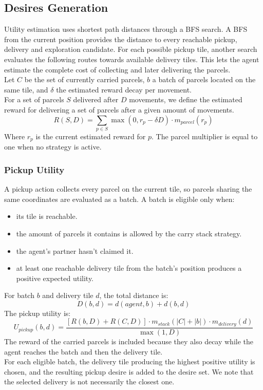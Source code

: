 \documentclass[11pt,a4paper]{article}
\begin{document}
\subsection{Desires Generation}
Utility estimation uses shortest path distances through a BFS search. 
A BFS from the current position provides the distance to every reachable pickup, delivery and exploration candidate.
For each possible pickup tile, another search evaluates the following routes towards available delivery tiles. 
This lets the agent estimate the complete cost of collecting and later delivering the parcels.
\\Let $C$ be the set of currently carried parcels, $b$ a batch of parcels located on the same tile, and
$\delta$ the estimated reward decay per movement.
\\For a set of parcels $S$ delivered after $D$ movements, we define the estimated reward for delivering a set of parcels after a given amount of movements.
\begin{equation*}
    R(S,D) = \sum_{p \in S} \max(0, r_p - \delta D) \cdot m_{parcel}(r_p)
\end{equation*}
Where $r_p$ is the current estimated reward for $p$. The parcel multiplier is equal to one when no strategy is active.

\subsubsection{Pickup Utility}
A pickup action collects every parcel on the current tile, so parcels sharing the same coordinates are evaluated as a batch. 
A batch is eligible only when:
\begin{itemize}
    \item its tile is reachable.
    \item the amount of parcels it contains is allowed by the carry stack strategy.
    \item the agent's partner hasn't claimed it.
    \item at least one reachable delivery tile from the batch's position produces a positive expected utility.
\end{itemize}
For batch $b$ and delivery tile $d$, the total distance is:
\begin{equation*}
    D(b,d) = d(agent,b) + d(b,d)
\end{equation*}
The pickup utility is:
\begin{equation*}
    U_{pickup}(b,d) = \frac{[R(b,D) + R(C,D)] \cdot m_{stack}(\lvert C \rvert + \lvert b \rvert) \cdot m_{delivery}(d)}{\max(1,D)}
\end{equation*}
The reward of the carried parcels is included because they also decay while the agent reaches the batch and then the delivery tile.
\\For each eligible batch, the delivery tile producing the highest positive utility is chosen, and the resulting pickup desire is added to the desire set.
We note that the selected delivery is not necessarily the closest one.
\end{document}
